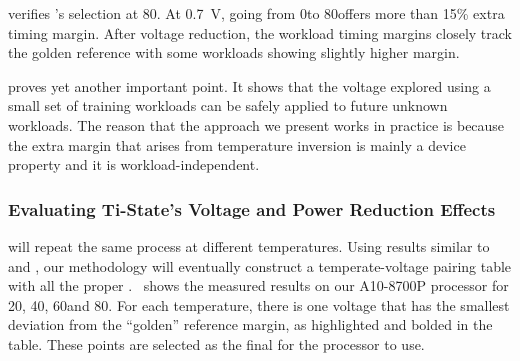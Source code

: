  verifies 's \tistate selection at 80\C. At 0.7~V, going from 0\C to 80\C offers more than 15\% extra timing margin. After voltage reduction, the workload timing margins closely track the golden reference with some workloads showing slightly higher margin.

 proves yet another important point. It shows that the voltage explored using a small set of training workloads can be safely applied to future unknown workloads. The reason that the approach we present works in practice is because the extra margin that arises from temperature inversion is mainly a device property and it is workload-independent.

\subsubsection{Evaluating Ti-State's Voltage and Power Reduction Effects}
\label{sec:tistate:tistate:table}

 will repeat the same process at different temperatures. Using results similar to~ and , our methodology will eventually construct a temperate-voltage pairing table with all the proper \tistates.~ shows the measured results on our A10-8700P processor for 20\C, 40\C, 60\C and 80\C. For each temperature, there is one voltage that has the smallest deviation from the ``golden'' reference margin, as highlighted and bolded in the table. These points are selected as the final \tistates for the processor to use.

